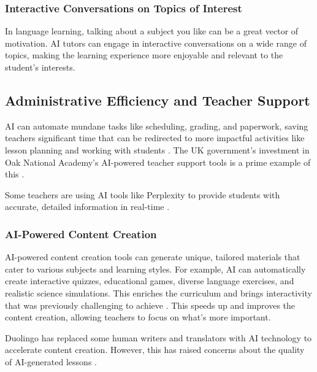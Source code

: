 \documentclass{article}
\begin{document}
\subsubsection{Interactive Conversations on Topics of Interest}

In language learning, talking about a subject you like can be
a great vector of motivation. AI tutors can engage in interactive
conversations on a wide range of topics, making the learning
experience more enjoyable and relevant to the student's interests.

\subsection{Administrative Efficiency and Teacher Support}

AI can automate mundane tasks like scheduling, grading, and
paperwork, saving teachers significant time that can be redirected
to more impactful activities like lesson planning and working with
students \cite{datasciencecentral_automated_grading} \cite{mckinsey_ai_k12_teachers}.
The UK government's investment in Oak National Academy's
AI-powered teacher support tools is a prime example
of this \cite{govuk_ai_teacher_support}
\cite{openaccessgov_ai_teacher_support}.

Some teachers are using AI tools like Perplexity to provide
students with accurate, detailed information in real-time
\cite{tri_cityherald_ai_cheating}.


\subsubsection{AI-Powered Content Creation}

AI-powered content creation tools can generate unique,
tailored materials that cater to various subjects and learning styles.
For example, AI can automatically create interactive quizzes,
educational games, diverse language exercises, and realistic
science simulations. This enriches the curriculum and brings
interactivity that was previously challenging to achieve
\cite{neurosys2023generative}.
This speeds up and improves the content creation,
allowing teachers to focus on what's more important.

Duolingo has replaced some human writers and translators
with AI technology to accelerate content creation. However,
this has raised concerns about the quality of AI-generated lessons
\cite{baselinemag2023duolingo}.
\end{document}
